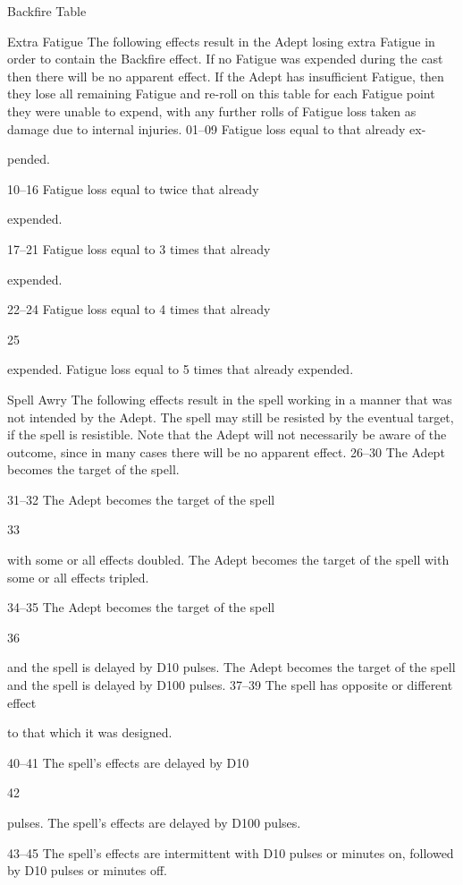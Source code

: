 \begin{Chapter}{Backfire Table}

Extra Fatigue The following effects result in the 
Adept losing extra Fatigue in order to contain the 
Backfire effect. If no Fatigue was expended during 
the cast then there will be no apparent effect. If the 
Adept has insufficient Fatigue, then they lose all 
remaining Fatigue and re-roll on this table for each 
Fatigue point they were unable to expend, with any 
further rolls of Fatigue loss taken as damage due to 
internal injuries. 
01–09   Fatigue loss equal to that already ex-

pended. 

10–16   Fatigue loss equal to twice that already 

expended. 

17–21   Fatigue loss equal to 3 times that already 

expended. 

22–24   Fatigue loss equal to 4 times that already 

25  

expended. 
Fatigue loss equal to 5 times that already 
expended. 

Spell Awry The following effects result in the 
spell working in a manner that was not intended by 
the Adept. The spell may still be resisted by the 
eventual target, if the spell is resistible. Note that 
the Adept will not necessarily be aware of the 
outcome, since in many cases there will be no 
apparent effect. 
26–30   The Adept becomes the target of the spell. 

31–32   The Adept becomes the target of the spell 

33  

with some or all effects doubled. 
The Adept becomes the target of the spell 
with some or all effects tripled. 

34–35   The Adept becomes the target of the spell 

36  

and the spell is delayed by D10 pulses. 
The Adept becomes the target of the spell 
and the spell is delayed by D100 pulses. 
37–39   The spell has opposite or different effect 

to that which it was designed. 

40–41  The spell’s effects are delayed by D10 

42  

pulses. 
The spell’s effects are delayed by D100 
pulses. 

43–45   The spell’s effects are intermittent with 
D10 pulses or minutes on, followed by 
D10 pulses or minutes off. 


\end{Chapter}
